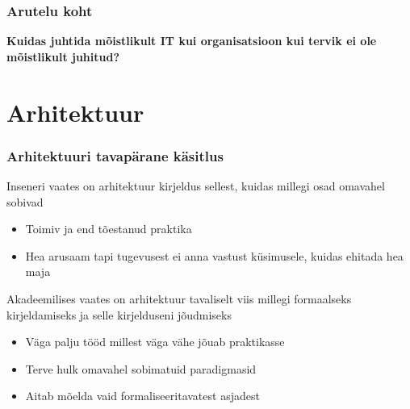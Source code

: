 \begin{frame}[fragile]
  \frametitle{Arutelu koht}
		\begin{center}
			\textbf{Kuidas juhtida mõistlikult IT kui organisatsioon kui tervik ei ole mõistlikult juhitud?}
		\end{center}
\end{frame}

\section{Arhitektuur}

\begin{frame}[fragile]
  \frametitle{Arhitektuuri tavapärane käsitlus}
		Inseneri vaates on arhitektuur kirjeldus sellest, kuidas millegi osad omavahel sobivad
		\begin{itemize}
			\item Toimiv ja end tõestanud praktika
			\item Hea arusaam tapi tugevusest ei anna vastust küsimusele, kuidas ehitada hea maja
		\end{itemize}
		
		Akadeemilises vaates on arhitektuur tavaliselt viis millegi formaalseks kirjeldamiseks ja selle kirjelduseni jõudmiseks
		\begin{itemize}
			\item Väga palju tööd millest väga vähe jõuab praktikasse
			\item Terve hulk omavahel sobimatuid paradigmasid
			\item Aitab mõelda vaid formaliseeritavatest asjadest
		\end{itemize}
		
\end{frame}

